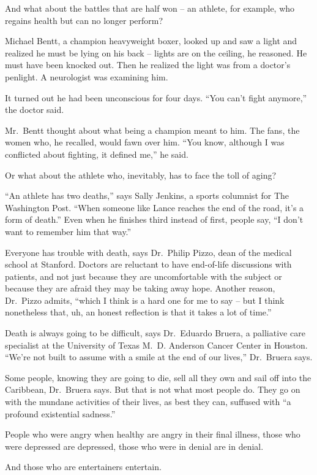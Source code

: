 ﻿\documentclass[12pt]{article}
\begin{document}
And what about the battles that are half won -- an athlete, for example, who regains health but can
no longer perform?

Michael Bentt, a champion heavyweight boxer, looked up and saw a light and realized he must be lying
on his back -- lights are on the ceiling, he reasoned. He must have been knocked out. Then he
realized the light was from a doctor's penlight. A neurologist was examining him.

It turned out he had been unconscious for four days. ``You can't fight anymore,'' the doctor said.

Mr.~Bentt thought about what being a champion meant to him. The fans, the women who, he recalled,
would fawn over him. ``You know, although I was conflicted about fighting, it defined me,'' he said.

Or what about the athlete who, inevitably, has to face the toll of aging?

``An athlete has two deaths,'' says Sally Jenkins, a sports columnist for The Washington Post.
``When someone like Lance reaches the end of the road, it's a form of death.'' Even when he finishes
third instead of first, people say, ``I don't want to remember him that way.''

Everyone has trouble with death, says Dr.~Philip Pizzo, dean of the medical school at Stanford.
Doctors are reluctant to have end-of-life discussions with patients, and not just because they are
uncomfortable with the subject or because they are afraid they may be taking away hope. Another
reason, Dr.~Pizzo admits, ``which I think is a hard one for me to say -- but I think nonetheless
that, uh, an honest reflection is that it takes a lot of time.''

Death is always going to be difficult, says Dr.~Eduardo Bruera, a palliative care specialist at the
University of Texas M.~D. Anderson Cancer Center in Houston. ``We're not built to assume with a
smile at the end of our lives,'' Dr.~Bruera says.

Some people, knowing they are going to die, sell all they own and sail off into the Caribbean,
Dr.~Bruera says. But that is not what most people do. They go on with the mundane activities of
their lives, as best they can, suffused with ``a profound existential sadness.''

People who were angry when healthy are angry in their final illness, those who were depressed are
depressed, those who were in denial are in denial.

And those who are entertainers entertain.
\end{document}
